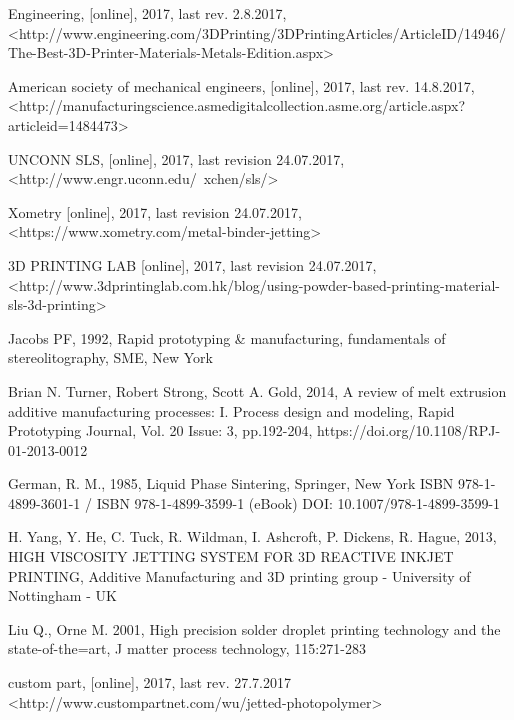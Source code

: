 \documentclass[a4paper, 11pt, reqno]{report}
\begin{document}
\begin{thebibliography}{99}
	Engineering,
	[online],
	2017,
	last rev. 2.8.2017,	\\
	<http://www.engineering.com/3DPrinting/3DPrintingArticles/ArticleID/14946/The-Best-3D-Printer-Materials-Metals-Edition.aspx>
	
	American society of mechanical engineers,
	[online],
	2017,
	last rev. 14.8.2017,
	<http://manufacturingscience.asmedigitalcollection.asme.org/article.aspx?articleid=1484473>	
	
	UNCONN SLS,
	[online],
	2017,
	last revision 24.07.2017,
	<http://www.engr.uconn.edu/~xchen/sls/>
	
	Xometry
	[online],
	2017,
	last revision 24.07.2017,
	<https://www.xometry.com/metal-binder-jetting>
	
	3D PRINTING LAB
	[online],
	2017,
	last revision 24.07.2017,
	<http://www.3dprintinglab.com.hk/blog/using-powder-based-printing-material-sls-3d-printing>
	
	Jacobs PF,
	1992,
	Rapid prototyping \& manufacturing,
	fundamentals of stereolitography,
	SME,
	New York
	
	Brian N. Turner, Robert Strong, Scott A. Gold,
	2014,
	A review of melt extrusion additive manufacturing processes: I. Process design and modeling,
	Rapid Prototyping Journal, Vol. 20 Issue: 3, pp.192-204,
	https://doi.org/10.1108/RPJ-01-2013-0012
	

		
	German, R. M.,
	1985,
	Liquid Phase Sintering,
	Springer,
	New York
	ISBN 978-1-4899-3601-1 / ISBN 978-1-4899-3599-1 (eBook)
	DOI: 10.1007/978-1-4899-3599-1

	H. Yang, Y. He, C. Tuck, R. Wildman, I. Ashcroft, P. Dickens, R. Hague,
	2013,
	HIGH VISCOSITY JETTING SYSTEM FOR 3D REACTIVE INKJET PRINTING,
	Additive Manufacturing and 3D printing group - University of Nottingham - UK 

	Liu Q., Orne M.
	2001,
	High precision solder droplet printing technology and the state-of-the=art,
	J matter process technology,
	115:271-283
	
	custom part,
	[online],
	2017,
	last rev. 27.7.2017
	<http://www.custompartnet.com/wu/jetted-photopolymer>
	

\end{thebibliography}
\end{document}
